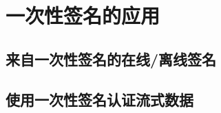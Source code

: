 \section{一次性签名的应用}\label{sec:14-5}

\subsection{来自一次性签名的在线/离线签名}\label{subsec:14-5-1}

\subsection{使用一次性签名认证流式数据}\label{subsec:14-5-2}